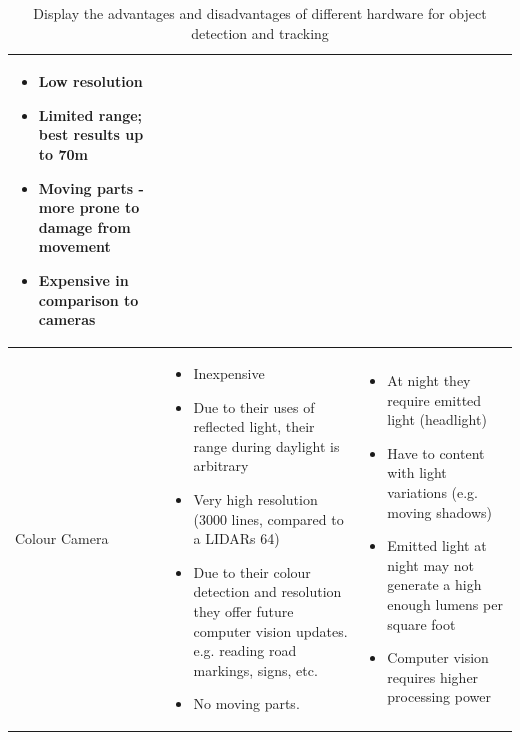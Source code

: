 \documentclass[]{report}
\begin{document}
\begin{table}[h]
{\begin{minipage}{\textwidth}
\begin{tabular}{ | m{1.2cm} | p{4.7cm} | p{4.7cm} |}
\begin{itemize}[leftmargin=*]
    	\item Low resolution 
    
    	\item Limited range; best results up to 70m
    
    	\item Moving parts - more prone to damage from movement
    
    	\item Expensive in comparison to cameras
    
	\end{itemize} \\ \hline 
      
    Colour Camera &
    
     \begin{itemize}[leftmargin=*]   
        	\item Inexpensive
        	
        	\item Due to their uses of reflected light, their range during daylight is arbitrary 
        	
        	\item Very high resolution (3000 lines, compared to a LIDARs 64)
        	
        	\item Due to their colour detection and resolution they offer future computer vision updates. e.g. reading road markings, signs, etc.
        	
        	\item No moving parts.
     \end{itemize} &
        
     \begin{itemize}[leftmargin=*]   
       	\item At night they require emitted light (headlight)
       
       \item Have to content with light variations (e.g. moving shadows)
       
       \item Emitted light at night may not generate a high enough lumens per square foot
      
       \item Computer vision requires higher processing power
        
    \end{itemize} \\ \hline 
    
   
    
    
    \end{tabular}


\caption[Table caption text]{Display the advantages and disadvantages of different hardware for object detection and tracking} 
\label{table:detect_hardware_comp}
\end{minipage} }
\end{table}
\end{document}
